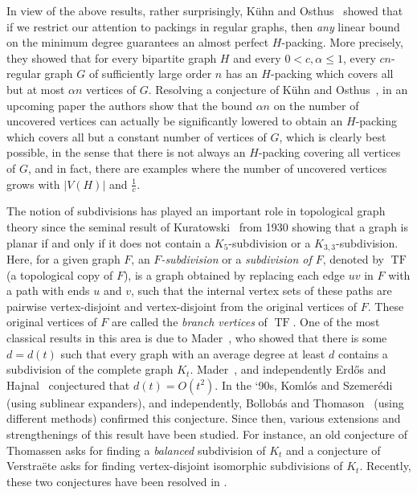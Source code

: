 \documentclass[10pt]{article}
\theoremstyle{plain}
\numberwithin{theorem}{section}
\theoremstyle{definition}
\theoremstyle{remark}
\DeclareMathOperator{\TF}{TF}
\theoremstyle{plain}
\begin{document}
In view of the above results, rather surprisingly, K\"uhn and Osthus~\cite{kuhn2005packings} showed that if we restrict our attention to packings in regular graphs, then \emph{any} linear bound on the minimum degree guarantees an almost perfect $H$-packing. More precisely, they showed that for every bipartite graph $H$ and every  $0 < c, \alpha \le 1$, every $cn$-regular graph $G$ of sufficiently large order $n$ has an $H$-packing which covers all but at most $\alpha n$ vertices of $G$. Resolving a conjecture of K\"uhn and Osthus~\cite{kuhn2005packings}, in an upcoming paper \cite{LetzterMetukuSudakovdense} the authors show that the bound $\alpha n$ on the number of uncovered vertices can actually be significantly lowered to obtain an $H$-packing which covers all but a constant number of vertices of $G$, which is clearly best possible, in the sense that there is not always an $H$-packing covering all vertices of $G$, and in fact, there are examples where the number of uncovered vertices grows with $|V(H)|$ and $\frac{1}{c}$.

The notion of subdivisions has played an important role in topological graph theory since the seminal result of Kuratowski~\cite{kuratowski1930probleme} from 1930 showing that a graph is planar if and only if it does not contain a $K_5$-subdivision or a $K_{3,3}$-subdivision. Here, for a given graph $F$, an \emph{$F$-subdivision} or a \emph{subdivision of $F$}, denoted by $\TF$ (a topological copy of $F$), is a graph obtained by replacing each edge $uv$ in $F$ with a path with ends $u$ and $v$, such that the internal vertex sets of these paths are pairwise vertex-disjoint and vertex-disjoint from the original vertices of $F$.
These original vertices of $F$ are called the \emph{branch vertices} of $\TF$. One of the most classical results in this area is due to Mader~\cite{MR0220616}, who showed that
there is some $d = d(t)$ such that every graph with an average degree at least $d$ contains a
subdivision of the complete graph $K_t$. Mader~\cite{MR0220616}, and independently Erd\H{o}s and Hajnal~\cite{MR0173247} conjectured that $d(t) = O(t^2)$. In the `90s, Koml\'os and Szemer\'edi~\cite{komlos1994topological, komlos1996topological} (using sublinear expanders), and independently, Bollob\'as and Thomason~\cite{bollobas1998proof} (using different methods) confirmed this conjecture. Since then, various extensions and strengthenings of this result have been studied. For instance, an old conjecture of Thomassen asks for finding a \emph{balanced} subdivision of $K_t$ and a conjecture of Verstra\"ete asks for finding vertex-disjoint isomorphic subdivisions of $K_t$. Recently, these two conjectures have been resolved in \cite{fernandez2023disjoint, liu2017proof}. 
\end{document}
